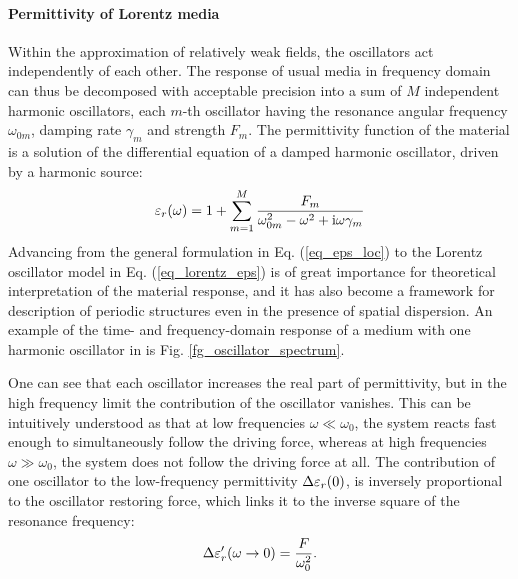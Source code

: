 \paragraph{Permittivity of Lorentz media} Within the approximation of relatively weak fields, the oscillators act independently of each other.
The response of usual media in frequency domain can thus be decomposed with acceptable precision into a sum of $M$ independent harmonic oscillators, each $m$-th oscillator having the resonance angular frequency $\omega_{0m}$, damping rate $\gamma_m$ and strength $F_m$.
The permittivity function of the material is a solution of the differential equation of a damped harmonic oscillator, driven by a harmonic source:
\begin{equation} \varepsilon_r(\omega) = 1 + \sum_{m=1}^M \frac{F_m}{\omega_{0m}^2 - \omega^2 + {\mathrm i}\omega\gamma_m} \label{eq_lorentz_eps}\end{equation} %
Advancing from the general formulation in Eq. (\ref{eq_eps_loc}) to the Lorentz oscillator model in Eq. (\ref{eq_lorentz_eps}) is of great importance for theoretical interpretation of the material response, and it has also become a framework for description of periodic structures even in the presence of spatial dispersion.  %
An example of the time- and frequency-domain response of a medium with one harmonic oscillator in is Fig. \ref{fg_oscillator_spectrum}.

One can see that each oscillator increases the real part of permittivity, but in the high frequency limit the contribution of the oscillator vanishes. This can be intuitively understood as that at low frequencies $\omega \ll \omega_0$, the system reacts fast enough to simultaneously follow the driving force, whereas at high frequencies  $\omega \gg \omega_0$, the system does not follow the driving force at all.
The contribution of one oscillator to the low-frequency permittivity $\Delta\varepsilon_r(0)$, is inversely proportional to the oscillator restoring force, which links it to the inverse square of the resonance frequency:
\begin{equation} \Delta \varepsilon_r'(\omega\rightarrow0) = \frac{F}{\omega_0^{2}}.  \label{eq_delta_eps} \end{equation}

